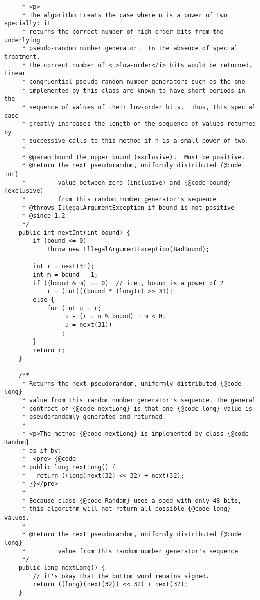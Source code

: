 \documentclass[12pt,a4paper,twoside,openright,titlepage,final]{article}
\begin{document}
\begin{verbatim}
     * <p>
     * The algorithm treats the case where n is a power of two specially: it
     * returns the correct number of high-order bits from the underlying
     * pseudo-random number generator.  In the absence of special treatment,
     * the correct number of <i>low-order</i> bits would be returned.  Linear
     * congruential pseudo-random number generators such as the one
     * implemented by this class are known to have short periods in the
     * sequence of values of their low-order bits.  Thus, this special case
     * greatly increases the length of the sequence of values returned by
     * successive calls to this method if n is a small power of two.
     *
     * @param bound the upper bound (exclusive).  Must be positive.
     * @return the next pseudorandom, uniformly distributed {@code int}
     *         value between zero (inclusive) and {@code bound} (exclusive)
     *         from this random number generator's sequence
     * @throws IllegalArgumentException if bound is not positive
     * @since 1.2
     */
    public int nextInt(int bound) {
        if (bound <= 0)
            throw new IllegalArgumentException(BadBound);

        int r = next(31);
        int m = bound - 1;
        if ((bound & m) == 0)  // i.e., bound is a power of 2
            r = (int)((bound * (long)r) >> 31);
        else {
            for (int u = r;
                 u - (r = u % bound) + m < 0;
                 u = next(31))
                ;
        }
        return r;
    }

    /**
     * Returns the next pseudorandom, uniformly distributed {@code long}
     * value from this random number generator's sequence. The general
     * contract of {@code nextLong} is that one {@code long} value is
     * pseudorandomly generated and returned.
     *
     * <p>The method {@code nextLong} is implemented by class {@code Random}
     * as if by:
     *  <pre> {@code
     * public long nextLong() {
     *   return ((long)next(32) << 32) + next(32);
     * }}</pre>
     *
     * Because class {@code Random} uses a seed with only 48 bits,
     * this algorithm will not return all possible {@code long} values.
     *
     * @return the next pseudorandom, uniformly distributed {@code long}
     *         value from this random number generator's sequence
     */
    public long nextLong() {
        // it's okay that the bottom word remains signed.
        return ((long)(next(32)) << 32) + next(32);
    }


\end{verbatim}
\end{document}
